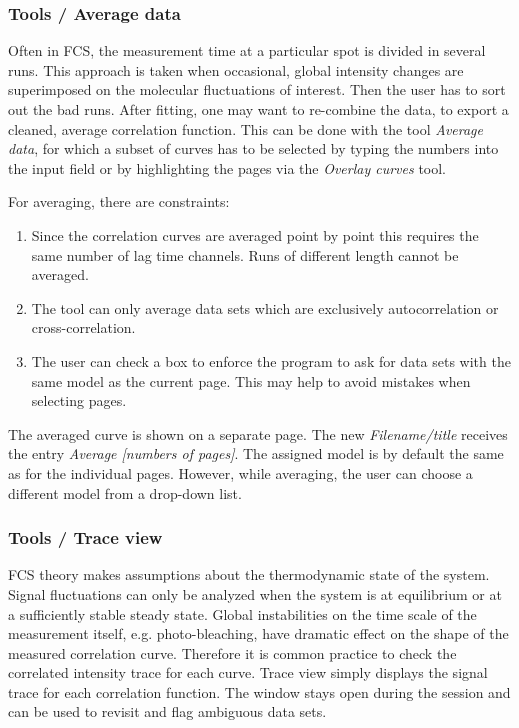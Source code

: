 \subsubsection{Tools / Average data}

Often in FCS, the measurement time at a particular spot is divided in several runs. This approach is taken when occasional, global intensity changes are superimposed on the molecular fluctuations of interest. Then the user has to sort out the bad runs. After fitting, one may want to re-combine the data, to export a cleaned, average correlation function. This can be done with the tool \textit{Average data}, for which a subset of curves has to be selected by typing the numbers into the input field or by highlighting the pages via the \textit{Overlay curves} tool. 

For averaging, there are constraints:


\begin{enumerate}
\item Since the correlation curves are averaged point by point this requires the same number of lag time channels. Runs of different length cannot be averaged.
\item The tool can only average data sets which are exclusively autocorrelation or cross-correlation.
\item The user can check a box to enforce the program to ask for data sets with the same model as the current page. This may help to avoid mistakes when selecting pages.
\end{enumerate}
The averaged curve is shown on a separate page. The new \textit{Filename/title} receives the entry \textit{Average [numbers of pages]}. The assigned model is by default the same as for the individual pages. However, while averaging, the user can choose a different model from a drop-down list. 

\subsubsection{Tools / Trace view}

FCS theory makes assumptions about the thermodynamic state of the system. Signal fluctuations can only be analyzed when the system is at equilibrium or at a sufficiently stable steady state. Global instabilities on the time scale of the measurement itself, e.g. photo-bleaching, have dramatic effect on the shape of the measured correlation curve. Therefore it is common practice to check the correlated intensity trace for each curve. Trace view simply displays the signal trace for each correlation function. The window stays open during the session and can be used to revisit and flag ambiguous data sets.

